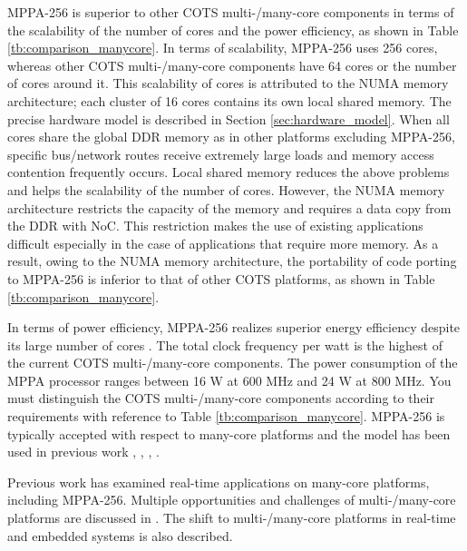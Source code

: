 MPPA-256 is superior to other COTS multi-/many-core components in terms of the scalability of the number of cores and the power efficiency, as shown in Table \ref{tb:comparison_manycore}.
In terms of scalability, MPPA-256 uses 256 cores, whereas other COTS multi-/many-core components have 64 cores or the number of cores around it.
This scalability of cores is attributed to the NUMA memory architecture; each cluster of 16 cores contains its own local shared memory.
The precise hardware model is described in Section \ref{sec:hardware_model}.
When all cores share the global DDR memory as in other platforms excluding MPPA-256, specific bus/network routes receive extremely large loads and memory access contention frequently occurs.
Local shared memory reduces the above problems and helps the scalability of the number of cores.
However, the NUMA memory architecture restricts the capacity of the memory and requires a data copy from the DDR with NoC.
This restriction makes the use of existing applications difficult especially in the case of applications that require more memory.
As a result, owing to the NUMA memory architecture, the portability of code porting to MPPA-256 is inferior to that of other COTS platforms, as shown in Table \ref{tb:comparison_manycore}.

In terms of power efficiency, MPPA-256 realizes superior energy efficiency despite its large number of cores \cite{kanter2015kalray}.
The total clock frequency per watt is the highest of the current COTS multi-/many-core components.
The power consumption of the MPPA processor ranges between 16 W at 600 MHz and 24 W at 800 MHz.
You must distinguish the COTS multi-/many-core components according to their requirements with reference to Table \ref{tb:comparison_manycore}.
MPPA-256 is typically accepted with respect to many-core platforms and the model has been used in previous work \cite{becker2016contention}, \cite{carle2014static}, \cite{perret2016mapping}, \cite{perret2016predictable}.

Previous work has examined real-time applications on many-core platforms, including MPPA-256.
Multiple opportunities and challenges of multi-/many-core platforms are discussed in \cite{saidi2015shift}.
The shift to multi-/many-core platforms in real-time and embedded systems is also described. 

